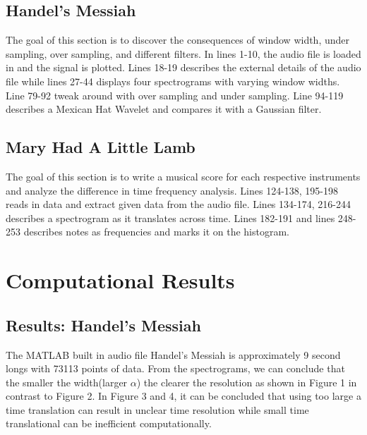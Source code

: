 \documentclass[a4paper,12pt]{article}
\begin{document}
\subsection{Handel's Messiah}
The goal of this section is to discover the consequences of window width, under sampling, over sampling, and different filters.
In lines 1-10, the audio file is loaded in and the signal is plotted. Lines 18-19 describes the external details of the audio file while lines 27-44 displays four spectrograms with varying window widths. Line 79-92 tweak around with over sampling and under sampling. Line 94-119 describes a Mexican Hat Wavelet and compares it with a Gaussian filter.
\subsection{Mary Had A Little Lamb}
The goal of this section is to write a musical score for each respective instruments and analyze the difference in time frequency analysis.
Lines 124-138, 195-198 reads in data and extract given data from the audio file. Lines 134-174, 216-244 describes a spectrogram as it translates across time. Lines 182-191 and lines 248-253 describes notes as frequencies and marks it on the histogram.

\section{Computational Results}

\subsection{Results: Handel's Messiah}
The MATLAB built in audio file Handel's Messiah is approximately 9 second longs with 73113 points of data. From the spectrograms, we can conclude that the smaller the width(larger $\alpha$) the clearer the resolution as shown in Figure 1 in contrast to Figure 2. In Figure 3 and 4, it can be concluded that using too large a time translation can result in unclear time resolution while small time translational can be inefficient computationally.
\end{document}
